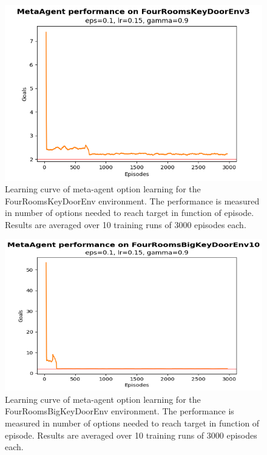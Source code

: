\documentclass[conference]{IEEEtran}
\begin{document}
\begin{figure}[ht]
\centering
\includegraphics[width=0.9\columnwidth]{img/exp_option_her_keydoor_small.png}
\caption{Learning curve of meta-agent option learning for the FourRoomsKeyDoorEnv environment. The performance is measured in number of options needed to reach target in function of episode. Results are averaged over 10 training runs of 3000 episodes each.}
\label{fig:exp_option_her_training_small}
\end{figure}

\begin{figure}[ht]
\centering
\includegraphics[width=0.9\columnwidth]{img/exp_option_her_keydoor_big.png}
\caption{Learning curve of meta-agent option learning for the FourRoomsBigKeyDoorEnv environment. The performance is measured in number of options needed to reach target in function of episode. Results are averaged over 10 training runs of 3000 episodes each.}
\label{fig:exp_option_her_training_big}
\end{figure}
\end{document}
